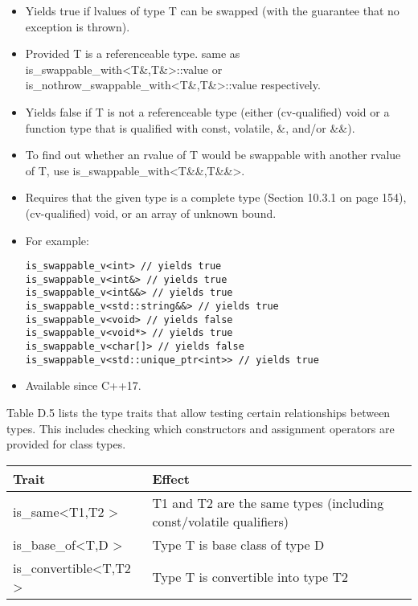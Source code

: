 \begin{itemize}
\item
Yields true if lvalues of type T can be swapped (with the guarantee that no exception is thrown).

\item
Provided T is a referenceable type. same as is\_swappable\_with<T\&,T\&>::value or is\_nothrow\_swappable\_with<T\&,T\&>::value respectively.

\item
Yields false if T is not a referenceable type (either (cv-qualified) void or a function type that is qualified with const, volatile, \&, and/or \&\&).

\item
To find out whether an rvalue of T would be swappable with another rvalue of T, use is\_swappable\_with<T\&\&,T\&\&>.

\item
Requires that the given type is a complete type (Section 10.3.1 on page 154), (cv-qualified) void, or an array of unknown bound.

\item
For example:
\begin{lstlisting}[style=styleCXX]
is_swappable_v<int> // yields true
is_swappable_v<int&> // yields true
is_swappable_v<int&&> // yields true
is_swappable_v<std::string&&> // yields true
is_swappable_v<void> // yields false
is_swappable_v<void*> // yields true
is_swappable_v<char[]> // yields false
is_swappable_v<std::unique_ptr<int>> // yields true
\end{lstlisting}

\item
Available since C++17.
\end{itemize}


Table D.5 lists the type traits that allow testing certain relationships between types. This includes checking which constructors and assignment operators are provided for class types.

\begin{table}[H]
	\begin{tabular}{|l|l|}
		\hline
		\textbf{Trait}                                & \textbf{Effect}                                                    \\ \hline
		is\_same\textless{}T1,T2 \textgreater{}       & T1 and T2 are the same types (including const/volatile qualifiers) \\ \hline
		is\_base\_of\textless{}T,D \textgreater{}     & Type T is base class of type D                                     \\ \hline
		is\_convertible\textless{}T,T2 \textgreater{} & Type T is convertible into type T2                                 \\ \hline
	\end{tabular}
\end{table}

